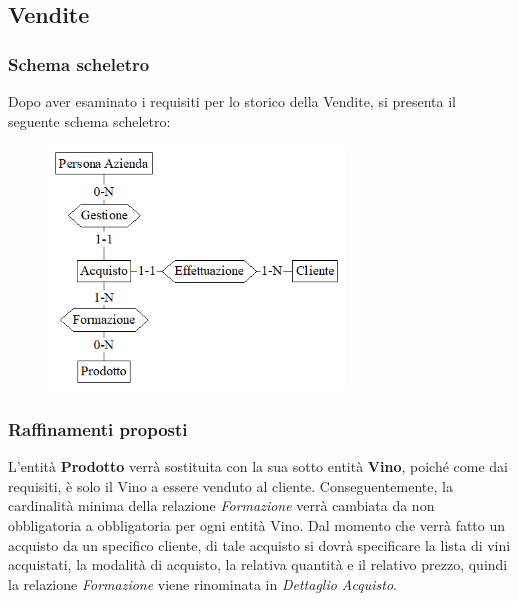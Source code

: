 \documentclass{article}
\begin{document}
\subsection{Vendite}
\subsubsection{Schema scheletro}
Dopo aver esaminato i requisiti per lo storico della Vendite, si presenta il seguente schema scheletro:
\begin{figure}[htbp]
\centering
\includegraphics[width=0.7\textwidth]{img/Vendite_Scheletro}
\end{figure}
\subsubsection{Raffinamenti proposti}
L'entità \textbf{Prodotto} verrà sostituita con la sua sotto entità \textbf{Vino}, poiché come dai requisiti, è solo il Vino a essere venduto al cliente. Conseguentemente, la cardinalità minima della relazione \textit{Formazione} verrà cambiata da non obbligatoria a obbligatoria per ogni entità Vino.
\newline\newline
Dal momento che verrà fatto un acquisto da un specifico cliente, di tale acquisto si dovrà specificare la lista di vini acquistati, la modalità di acquisto, la relativa quantità e il relativo prezzo, quindi la relazione \textit{Formazione} viene rinominata in \textit{Dettaglio Acquisto}.
\end{document}
